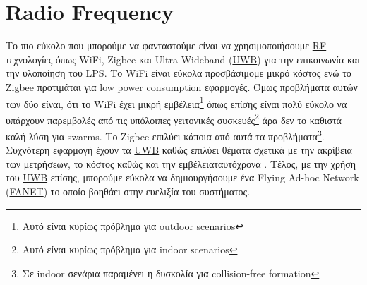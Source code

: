 


\section{Radio Frequency}
Το πιο εύκολο που μπορούμε να φανταστούμε είναι να χρησιμοποιήσουμε \hyperref[abbr:RF]{RF} τε\-χνο\-λο\-γίες
όπως WiFi, Zigbee και Ultra-Wideband (\hyperref[abbr:UWB]{UWB}) για την επικοινωνία και την υλοποίηση του \hyperref[abbr:LPS]{LPS}.   
Το WiFi είναι εύκολα προσβάσιμο\udot με μικρό κόστος ενώ το Zigbee προτιμάται για
low power consumption εφαρμογές. Όμως προβλήματα αυτών των δύο είναι, ότι το 
WiFi έχει μικρή εμβέλεια\footnote{Αυτό είναι κυρίως πρόβλημα για outdoor scenarios} όπως επίσης είναι πολύ εύκολο 
να υπάρχουν παρεμβολές από τις υπόλοιπες γειτονικές συσκευές\footnote{Αυτό είναι κυρίως πρόβλημα για indoor scenarios} 
άρα δεν το καθιστά καλή λύση για swarms. Το Zigbee επιλύει κάποια από αυτά τα 
προβλήματα\footnote{Σε indoor σενάρια παραμένει η δυσκολία για collision-free formation}. Συχνότερη εφαρμογή έχουν 
τα \hyperref[abbr:UWB]{UWB} καθώς επιλύει θέματα σχετικά με την ακρίβεια των μετρήσεων, το κόστος καθώς και την 
εμβέλεια\udot ταυτόχρονα \cite{uwb-imu-gps3}. Τέλος, με την χρήση του \hyperref[abbr:UWB]{UWB} επίσης, μπορούμε εύκολα να δημιουργήσουμε
ένα Flying Ad-hoc Network (\hyperref[abbr:FANET]{FANET}) το οποίο βοηθάει στην ευελιξία του συστήματος.


